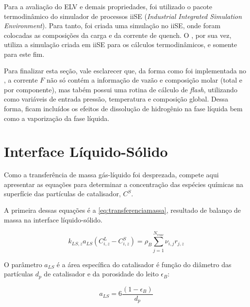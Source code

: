 Para a avaliação do ELV e demais propriedades, foi utilizado o pacote
termodinâmico do simulador de processos iiSE (\emph{Industrial Integrated
Simulation Environment}). Para tanto, foi criada uma simulação no iiSE, onde
foram colocadas as composições da carga e da corrente de quench. O \emso, por
sua vez, utiliza a simulação criada em iiSE para os cálculos termodinâmicos, e
somente para este fim. 

Para finalizar esta seção, vale esclarecer que, da forma como foi implementada
no \emso, a corrente $F$ não só contém a informação de vazão e composição molar
(total e por componente), mas tabém possui uma rotina de cálculo de
\emph{flash}, utilizando como variáveis de entrada pressão, temperatura e
composição global. Dessa forma, ficam incluídos os efeitos de dissolução de
hidrogênio na fase líquida bem como a vaporização da fase líquida.


\section{Interface Líquido-Sólido} \label{sec:interfaceliquidosolido}

Como a transferência de massa gás-líquido foi desprezada, compete aqui
apresentar as equações para determinar a concentração das espécies químicas
na superfície das partículas de catalisador, $C^S$. 

A primeira dessas equações é a \autoref{eq:transferenciamassa}, resultado de
balanço de massa na interface líquido-sólido.

\begin{equation}
k_{LS,z}a_{LS}(C^L_{i,z}-C^S_{i,z}) = \rho_B \displaystyle\sum_{j=1}^{N_{reac}}
\nu_{i,j}r_{j,z}
\label{eq:transferenciamassa}
\end{equation}

O parâmetro $a_{LS}$ é a área específica do catalisador é função do diâmetro das
partículas $d_p$ de catalisador e da porosidade do leito $\epsilon_B$:

\begin{equation}
a_{LS} = 6 \dfrac{(1-\epsilon_B)}{d_p}
\label{eq:aLS}
\end{equation}

